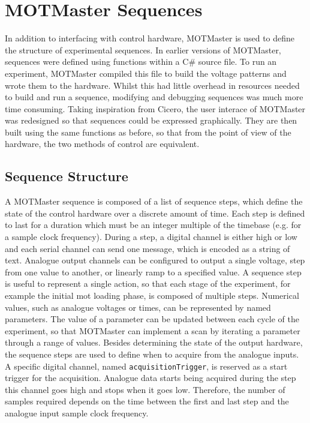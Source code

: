 \section{MOTMaster Sequences}
In addition to interfacing with control hardware, MOTMaster is used to define the structure of experimental sequences. In earlier versions of MOTMaster, sequences were defined using functions within a C\# source file. To run an experiment, MOTMaster compiled this file to build the voltage patterns and wrote them to the hardware. Whilst this had little overhead in resources needed to build and run a sequence, modifying and debugging sequences was much more time consuming. Taking inspiration from Cicero, the user interace of MOTMaster was redesigned so that sequences could be expressed graphically. They are then built using the same functions as before, so that from the point of view of the hardware, the two methods of control are equivalent. 

\subsection{Sequence Structure}
A MOTMaster sequence is composed of a list of sequence steps, which define the state of the control hardware over a discrete amount of time. Each step is defined to last for a duration which must be an integer multiple of the timebase (e.g.  for a  sample clock frequency). During a step, a digital channel is either high or low and each serial channel can send one message, which is encoded as a string of text. Analogue output channels can be configured to output a single voltage, step from one value to another, or linearly ramp to a specified value. A sequence step is useful to represent a single action, so that each stage of the experiment, for example the initial \ac{mot} loading phase, is composed of multiple steps. Numerical values, such as analogue voltages or times, can be represented by named parameters. The value of a parameter can be updated between each cycle of the experiment, so that MOTMaster can implement a scan by iterating a parameter through a range of values. Besides determining the state of the output hardware, the sequence steps are used to define when to acquire from the analogue inputs. A specific digital channel, named \verb|acquisitionTrigger|, is reserved as a start trigger for the acquisition. Analogue data starts being acquired during the step this channel goes high and stops when it goes low. Therefore, the number of samples required depends on the time between the first and last step and the analogue input sample clock frequency.
